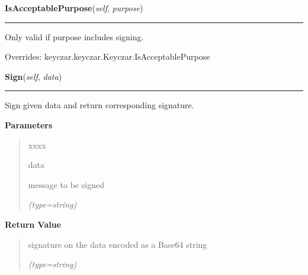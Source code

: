     \vspace{0.5ex}

\hspace{.8\funcindent}\begin{boxedminipage}{\funcwidth}

    \raggedright \textbf{IsAcceptablePurpose}(\textit{self}, \textit{purpose})

    \vspace{-1.5ex}

    \rule{\textwidth}{0.5\fboxrule}
\setlength{\parskip}{2ex}
    Only valid if purpose includes signing.

\setlength{\parskip}{1ex}
      Overrides: keyczar.keyczar.Keyczar.IsAcceptablePurpose

    \end{boxedminipage}

    \label{keyczar:keyczar:Signer:Sign}

    \vspace{0.5ex}

\hspace{.8\funcindent}\begin{boxedminipage}{\funcwidth}

    \raggedright \textbf{Sign}(\textit{self}, \textit{data})

    \vspace{-1.5ex}

    \rule{\textwidth}{0.5\fboxrule}
\setlength{\parskip}{2ex}
    Sign given data and return corresponding signature.

\setlength{\parskip}{1ex}
      \textbf{Parameters}
      \vspace{-1ex}

      \begin{quote}
        \begin{Ventry}{xxxx}

          \item[data]

          message to be signed

            {\it (type=string)}

        \end{Ventry}

      \end{quote}

      \textbf{Return Value}
    \vspace{-1ex}

      \begin{quote}
      signature on the data encoded as a Base64 string

      {\it (type=string)}

      \end{quote}

    \end{boxedminipage}


